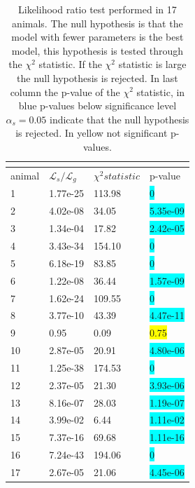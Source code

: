 \begin{table}[H]
\begin{tabular}{|p{2.5cm}|p{2.5cm}|p{2.5cm}|p{2.5cm}|}
\hline
\multicolumn{4}{|c|}{\cellcolor{blue!25}{Comparison between hRW model and Q L-F model (Likelihood ratio test)}}\\
\hline
 \cellcolor[gray]{0.9} animal & \cellcolor[gray]{0.9} $\mathcal{L}_s / \mathcal{L}_g$& \cellcolor[gray]{0.9} $\chi^2 statistic$ & \cellcolor[gray]{0.9} p-value\\
 \hline
 1& 1.77e-25 & 113.98 & \colorbox{cyan}{0}\\
 \hline
 2& 4.02e-08 & 34.05 & \colorbox{cyan}{5.35e-09}\\
 \hline
 3 & 1.34e-04 & 17.82 & \colorbox{cyan}{2.42e-05}\\
 \hline
 4 & 3.43e-34 & 154.10 & \colorbox{cyan}{0}\\
 \hline
 5 & 6.18e-19 & 83.85 & \colorbox{cyan}{0}\\
 \hline
 6 & 1.22e-08 & 36.44 & \colorbox{cyan}{1.57e-09}\\
 \hline
 7 & 1.62e-24 & 109.55 & \colorbox{cyan}{0}\\
 \hline
 8 & 3.77e-10 & 43.39 & \colorbox{cyan}{4.47e-11}\\
 \hline
 9 & 0.95 & 0.09 & \colorbox{yellow}{0.75}\\
 \hline
 10 & 2.87e-05 & 20.91 & \colorbox{cyan}{4.80e-06}\\
 \hline
 11 & 1.25e-38 & 174.53 & \colorbox{cyan}{0}\\
 \hline
 12 & 2.37e-05 & 21.30 & \colorbox{cyan}{3.93e-06}\\
 \hline
 13 & 8.16e-07 & 28.03 & \colorbox{cyan}{1.19e-07}\\
 \hline
 14 & 3.99e-02 & 6.44 & \colorbox{cyan}{1.11e-02}\\
 \hline
 15 & 7.37e-16 & 69.68 & \colorbox{cyan}{1.11e-16}\\
 \hline
 16 & 7.24e-43 & 194.06 & \colorbox{cyan}{0}\\
 \hline
 17 & 2.67e-05 & 21.06 & \colorbox{cyan}{4.45e-06}\\
 \hline
\end{tabular}
\caption{Likelihood ratio test performed in 17 animals. The null hypothesis is that the model with fewer parameters is the best model, this hypothesis is tested through the $\chi^2$ statistic. If the $\chi^2$ statistic is large the null hypothesis is rejected. In last column the p-value of the $\chi^2$ statistic, in blue p-values below significance level $\alpha_s=0.05$ indicate that the null hypothesis is rejected. In yellow not significant p-values.}
\label{tab:ModelComparison}
\end{table}

